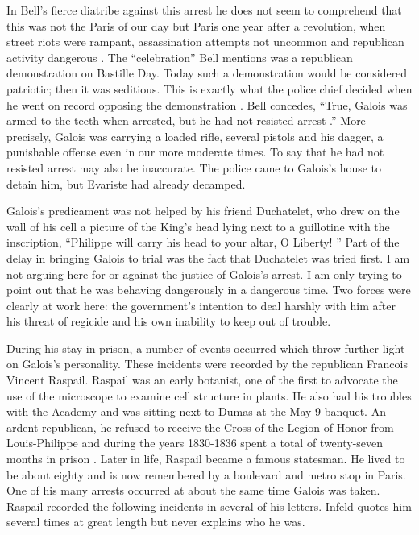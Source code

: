 \documentclass[12pt]{article}
\begin{document}
In Bell's fierce diatribe against this arrest he does not seem to comprehend that this was not the Paris of our day but Paris one year after a revolution, when street riots were rampant, assassination attempts not uncommon and republican activity dangerous \cite{57}. The ``celebration'' Bell mentions was a republican demonstration on Bastille Day. Today such a demonstration would be considered patriotic; then it was seditious. This is exactly what the police chief decided when he went on record opposing the demonstration \cite{58}. Bell concedes, ``True, Galois was armed to the teeth when arrested, but he had not resisted arrest \cite{59}.''  More precisely, Galois was carrying a loaded rifle, several pistols and his dagger, a punishable offense even in our more moderate times. To say that he had not resisted arrest may also be inaccurate. The police came to Galois's house to detain him, but Evariste had already decamped.

Galois's predicament was not helped by his friend Duchatelet, who drew on the wall of his cell a picture of the King's head lying next to a guillotine with the inscription, ``Philippe will carry his head to your altar, O Liberty! \cite{60}'' Part of the delay in bringing Galois to trial was the fact that Duchatelet was tried first. I am not arguing here for or against the justice of Galois's arrest. I am only trying to point out that he was behaving dangerously in a dangerous time. Two forces were clearly at work here: the government's intention to deal harshly with him after his threat of regicide and his own inability to keep out of trouble.

During his stay in prison, a number of events occurred which throw further light on Galois's personality. These incidents were recorded by the republican Francois Vincent Raspail. Raspail was an early botanist, one of the first to advocate the use of the microscope to examine cell structure in plants. He also had his troubles with the Academy and was sitting next to Dumas at the May 9 banquet. An ardent republican, he refused to receive the Cross of the Legion of Honor from Louis-Philippe and during the years 1830-1836 spent a total of twenty-seven months in prison \cite{61}. Later in life, Raspail became a famous statesman. He lived to be about eighty and is now remembered by a boulevard and metro stop in Paris. One of his many arrests occurred at about the same time Galois was taken. Raspail recorded the following incidents in several of his letters. Infeld quotes him several times at great length but never explains who he was.
\end{document}

